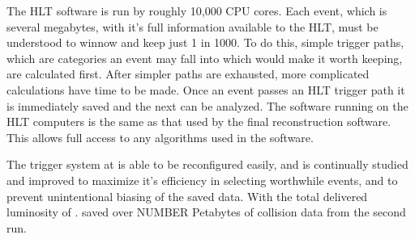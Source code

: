 The HLT software is run by roughly 10,000 CPU cores.  Each event, which is several megabytes, with it's full information available to the HLT, must be understood to winnow and keep just 1 in 1000.  To do this, simple trigger paths, which are categories an event may fall into which would make it worth keeping, are calculated first.  After simpler paths are exhausted, more complicated calculations have time to be made.  Once an event passes an HLT trigger path it is immediately saved and the next can be analyzed.  The software running on the HLT computers is the same as that used by the final reconstruction software.  This allows full access to any algorithms used in the software.

The trigger system at \CMS is able to be reconfigured easily, and is continually studied and improved to maximize it's efficiency in selecting worthwhile events, and to prevent unintentional biasing of the saved data.
With the total delivered luminosity of \GLNTOTALII .  \CMS saved over NUMBER Petabytes of collision data from the second run.




